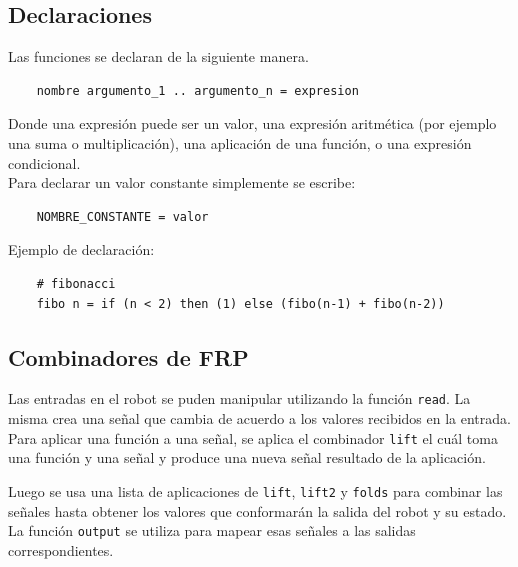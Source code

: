 \subsection{Declaraciones}

  Las funciones se declaran de la siguiente manera.

\begin{verbatim}
    nombre argumento_1 .. argumento_n = expresion
\end{verbatim}

  Donde una expresión puede ser un valor,
una expresión aritmética (por ejemplo una suma o multiplicación),
una aplicación de una función, o una expresión condicional.\\


  Para declarar un valor constante simplemente se escribe:

\begin{verbatim}
    NOMBRE_CONSTANTE = valor
\end{verbatim}

  Ejemplo de declaración:

\begin{verbatim}
    # fibonacci
    fibo n = if (n < 2) then (1) else (fibo(n-1) + fibo(n-2))
\end{verbatim}

\subsection{Combinadores de FRP}

  Las entradas en el robot se puden manipular utilizando la función \texttt{read}.
  La misma crea una señal que cambia de acuerdo a los valores recibidos en la entrada.\\

  Para aplicar una función a una señal, se aplica el combinador \texttt{lift} el cuál toma
  una función y una señal y produce una nueva señal resultado de la aplicación.

  Luego se usa una lista de aplicaciones de \texttt{lift},
\texttt{lift2} y \texttt{folds} para combinar las señales hasta
obtener los valores que conformarán la salida del robot y su estado.\\
  La función \texttt{output} se utiliza para mapear esas señales a las
salidas correspondientes.\\

